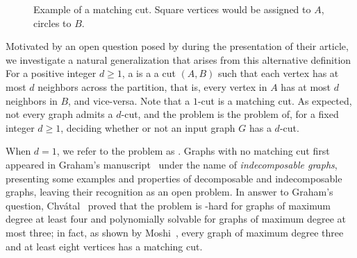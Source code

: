 \begin{figure}[!htb]
        \centering
        \caption{Example of a matching cut. Square vertices would be assigned to $A$, circles to $B$.\label{fig:matching_cut}}
    \end{figure}


Motivated by an open question posed by \cite{matching_cut_ipec} during the presentation of their article,  we investigate a natural generalization that arises from this alternative definition
For a positive integer $d \geq 1$, a  is a a cut $(A, B)$ such that each vertex has at most $d$ neighbors across the partition, that is, every vertex in $A$ has at most $d$ neighbors in $B$, and vice-versa. Note that a $1$-cut is a matching cut.
As expected, not every graph admits a $d$-cut, and the  problem is the problem of, for a fixed integer $d \geq 1$, deciding whether or not an input graph $G$ has a $d$-cut.

When $d=1$, we refer to the problem as .
Graphs with no matching cut first appeared in Graham's manuscript~\cite{matching_cut_graham} under the name of \textit{indecomposable graphs}, presenting some examples and properties of decomposable and indecomposable graphs, leaving their recognition as an open problem.
In answer to Graham's question, Chv\'atal~\cite{chvatal_matching_cut} proved that the problem is \NP-hard for graphs of maximum degree at least four and polynomially solvable for graphs of maximum degree at most three; in fact, as shown by Moshi~\cite{matching_cut_moshi}, every graph of maximum degree three and at least eight vertices has a matching cut.

